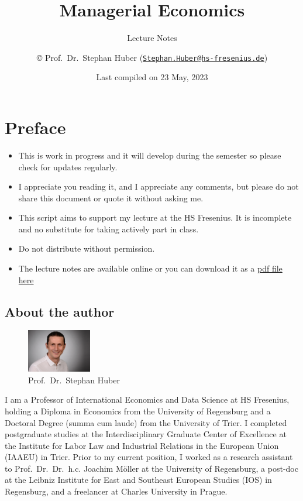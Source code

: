 \documentclass[
  12pt,
  oneside]{book}
\title{Managerial Economics}
\subtitle{Lecture Notes}
\author{© Prof.~Dr.~Stephan Huber (\href{mailto:Stephan.Huber@hs-fresenius.de}{\nolinkurl{Stephan.Huber@hs-fresenius.de}})}
\date{Last compiled on 23 May, 2023}
\providecommand{\tightlist}{%
  \setlength{\itemsep}{0pt}\setlength{\parskip}{0pt}}
\theoremstyle{definition}
\theoremstyle{definition}
\theoremstyle{definition}
\theoremstyle{definition}
\theoremstyle{remark}
\begin{document}
\maketitle

{
\hypersetup{linkcolor=}
\setcounter{tocdepth}{2}
\tableofcontents
}
\hypertarget{preface}{%
\chapter*{Preface}\label{preface}}

\begin{itemize}
\tightlist
\item
  This is work in progress and it will develop during the semester so please check for updates regularly.
\item
  I appreciate you reading it, and I appreciate any comments, but please do not share this document or quote it without asking me.
\item
  This script aims to support my lecture at the HS Fresenius. It is incomplete and no substitute
  for taking actively part in class.
\item
  Do not distribute without permission.
\item
  The lecture notes are available online or you can download it as a \href{https://raw.githubusercontent.com/hubchev/hubchev.github.io/main/me/_main.pdf}{pdf file here}
\end{itemize}

\hypertarget{about-the-author}{%
\section*{About the author}\label{about-the-author}}

\begin{figure}
\centering
\includegraphics[width=0.25\textwidth,height=\textheight]{fig/huber2.jpeg}
\caption[\label{fig:itsme} Prof.~Dr.~Stephan Huber]{\label{fig:itsme} Prof.~Dr.~Stephan Huber\footnotemark{}}
\end{figure}

I am a Professor of International Economics and Data Science at HS Fresenius, holding a Diploma in Economics from the University of Regensburg and a Doctoral Degree (summa cum laude) from the University of Trier. I completed postgraduate studies at the Interdisciplinary Graduate Center of Excellence at the Institute for Labor Law and Industrial Relations in the European Union (IAAEU) in Trier. Prior to my current position, I worked as a research assistant to Prof.~Dr.~Dr.~h.c. Joachim Möller at the University of Regensburg, a post-doc at the Leibniz Institute for East and Southeast European Studies (IOS) in Regensburg, and a freelancer at Charles University in Prague.
\end{document}
